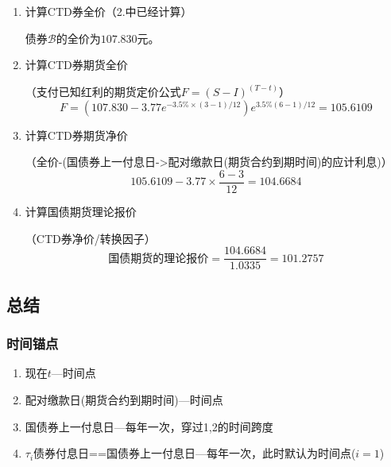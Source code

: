 \documentclass{article}
\begin{document}
\begin{enumerate}
\begin{enumerate}
        \[I R R_{j, t}=\frac{t \text { 时刻锁定的债券 } j \text { 期货交割全价 }-t \text { 时刻债券 } j \text { 现货全价 }+\sum_i \text { 期货剩余期限内债券的票息 } }{t \text { 时刻债券 } j \text { 现货全价 } \times \frac{T-t}{365 \text { 或 } 366}-\sum_i \text { 期货剩余期限内债券 } j \text { 的票息 } i \times \frac{T-\tau_i}{365 \text { 或 } 366}}\]
        \textbf{简记：}
        \begin{align}
        I R R_{j, t}&=\frac{\text { 债券\textbf{期货}全价 } -\text { 债券\textbf{现货}全价  } +\sum_i \text { \textbf{期货}剩余期限内债券的票息 }}{\text { 债券\textbf{现货}全价  }  \times \frac{\text{期货交割日}-t}{12}-\sum_i \text{\textbf{期货}剩余期限内债券的票息}\times \frac{\text{期货交割日}-\tau_i}{12}}\nonumber\\
        IRR_{\mathcal{B} ,t}&=\frac{104.6646-107.830+3.77}{107.830\times\frac{6-1}{12}-3.77\times\frac{6-3}{12}}=1.375\%  \nonumber
        \end{align}
        因为$IRR_\mathcal{A} <IRR_\mathcal{B} $，因此，选债券$\mathcal{B} $进行交割的可能性更大。
    \end{enumerate}


    \item 计算CTD券全价（2.中已经计算）
    
    债券$\mathcal{B} $的全价为$107.830$元。
    \item 计算CTD券期货全价
    
    （支付已知红利的期货定价公式$F=(S-I)^{(T-t)}$）
    \[F=(107.830-3.77e^{-3.5\%\times (3-1)/12})e^{3.5\%(6-1)/12}=105.6109\]
    \item 计算CTD券期货净价
    
    （全价-(国债券上一付息日->配对缴款日(期货合约到期时间)的应计利息)）
    \[105.6109-3.77\times\frac{6-3}{12}=104.6684\]
    \item 计算国债期货理论报价
    
    （CTD券净价/转换因子）
    \[\text{国债期货的理论报价}=\frac{104.6684}{1.0335}=101.2757\]
\end{enumerate}

\subsection{总结}
\subsubsection{时间锚点}
\begin{enumerate}
    \item {\color{blue}现在$t$}---时间点
    \item {\color{red}配对缴款日(期货合约到期时间)}---时间点
    \item {\color{Green}国债券上一付息日}---每年一次，穿过1,2的时间跨度
    \item {\color{Green}$\tau_i$债券付息日==国债券上一付息日}---每年一次，此时默认为时间点($i=1$)
\end{enumerate}
\end{document}
